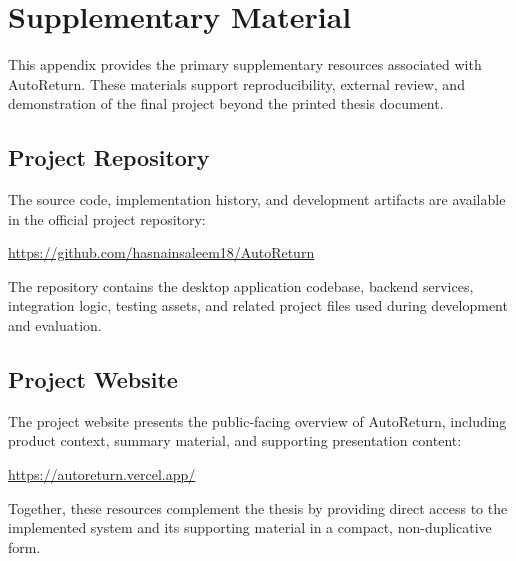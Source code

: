 \chapter{Supplementary Material}
\label{app:supplementary_material}

This appendix provides the primary supplementary resources associated with AutoReturn. These materials support reproducibility, external review, and demonstration of the final project beyond the printed thesis document.

\section{Project Repository}
The source code, implementation history, and development artifacts are available in the official project repository:

\noindent
\url{https://github.com/hasnainsaleem18/AutoReturn}

The repository contains the desktop application codebase, backend services, integration logic, testing assets, and related project files used during development and evaluation.

\section{Project Website}
The project website presents the public-facing overview of AutoReturn, including product context, summary material, and supporting presentation content:

\noindent
\url{https://autoreturn.vercel.app/}

Together, these resources complement the thesis by providing direct access to the implemented system and its supporting material in a compact, non-duplicative form.
